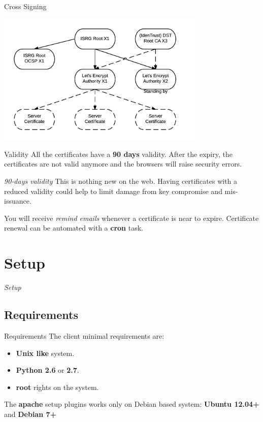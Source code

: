 \documentclass[xcolor=svgnames,11pt]{beamer}
\begin{document}
\begin{frame}{Cross Signing}
\begin{center}
\includegraphics[width=10cm]{img/certs.png}
\end{center}
\end{frame}

\begin{frame}{Validity}
All the certificates have a \textbf{90 days} validity. After the expiry, the certificates are not valid anymore and the browsers will raise security errors.

\medskip\pause

\begin{block}{\emph{90-days validity}}
This is nothing new on the web. Having certificates with a reduced validity could help to limit damage from key compromise and mis-issuance.
\end{block}

\medskip\pause
You will receive \emph{remind emails} whenever a certificate is near to expire. Certificate renewal can be automated with a \textbf{cron} task.
\end{frame}


\section{Setup}
\begin{frame}{}
\begin{center}
\begin{Huge}
\textcolor{leorange}{\emph{Setup}}
\end{Huge}
\end{center}
\end{frame}


\subsection{Requirements}
\begin{frame}{Requirements}
The client minimal requirements are: 
\begin{itemize}
  \item \textbf{Unix like} system.
  \item \textbf{Python 2.6} or \textbf{2.7}.
  \item \textbf{root} rights on the system.
\end{itemize}

\medskip\pause

The \textbf{apache} setup plugins works only on Debian based system: \textbf{Ubuntu 12.04+} and \textbf{Debian 7+}
\end{frame}
\end{document}
